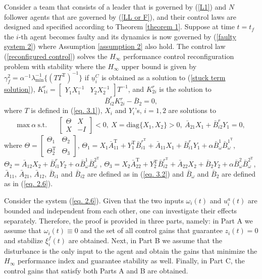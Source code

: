 \documentclass[12pt,draftcls,onecolumn]{IEEEtran}
\begin{document}
\begin{theorems}\label{theorem 2}
Consider a team that consists of  a leader that is governed by (\ref{L1}) and $N$ follower agents that are governed by (\ref{LL or F}), and their control laws are designed and specified according to Theorem \ref{theorem 1}. Suppose at time $t=t_f$ the $i$-th agent becomes faulty and its dynamics is now governed by (\ref{faulty system 2}) where Assumption \ref{assumption 2} also hold. The control law (\ref{reconfigured control}) solves the $H_{\infty}$ performance  control reconfiguration problem with stability  where the  $H_{\infty}$ upper bound is given by  $\gamma_f^2=\alpha^{-1}\lambda_{\text{min}}^{-1}\{(TT^{\text{T}})^{-1}\}$ if $\underline u_i^C$ is obtained as a solution to (\ref{stuck term solution}),  $K_{1i}^{r}=\begin{bmatrix}
Y_1X_1^{-1}&Y_2X_2^{-1}
\end{bmatrix}T^{-1}$, and $K_{2i}^{r}$ is the solution to 
\begin{equation}
  \bar B_{i2}^rK_{2i}^{r}-\bar B_{2}=0,\label{matching equation}
\end{equation}
 where $T$ is  defined in  (\ref{eq. 3.1}),  $X_i$ and $Y_i$'s, $i=1,2$ are solutions to 
\begin{eqnarray}
\text{max} \ \alpha \ \text{s.t.}&&  \begin{bmatrix}
\Theta&X\\
X&-I
\end{bmatrix}
<0, \ X=\text{diag}\{X_1,X_2\}>0,\ \bar A_{21}X_1+\bar B_{i2}^r Y_1= 0, \label{OPP}
\end{eqnarray}
where 
$
\Theta=\begin{bmatrix}\Theta_1&\Theta_2\\\Theta_2^{\text{T}}&\Theta_3\end{bmatrix}$, $
\Theta_1=X_1\bar A_{11}^{\text{T}}+Y_1^{\text{T}}\bar B_{i1}^{r^\text{T}}+\bar A_{11}X_1+\bar B_{i1}^r Y_1+\alpha \bar B^1_{\omega}\bar B_{\omega}^{1^{\text{T}}}$, $\Theta_2=\bar A_{12}X_2+\bar B_{i1}^rY_2+\alpha \bar B^1_{\omega}\bar B_{\omega}^{2^{\text{T}}}$, $\Theta_3=X_2\bar A_{22}^{\text{T}}+Y_2^{\text{T}}\bar B_{i2}^{r^{\text{T}}}+\bar A_{22}X_2+\bar B_{2}Y_2+\alpha\bar B^{2}_{\omega}\bar B_{\omega}^{2^\text{T}}$, $\bar A_{11}$, $\bar A_{21}$, $\bar A_{12}$, $\bar B_{i1}$ and $\bar B_{i2}$ are defined as in (\ref{eq. 3.2}) and $\bar B_{\omega}$ and $\bar B_2$ are  defined as in (\ref{eq. 2.6}).
 \end{theorems}
 \proof 
Consider the system (\ref{eq. 2.6}). Given that the two inputs $\omega_i(t)$ and $u_i^a(t)$  are bounded and independent from each other, one can investigate their effects separately. Therefore, the proof is provided in three parts, namely: in Part A we assume that $\omega_i(t)\equiv0$ and the set of all control gains that guarantee $z_i(t)=0$ and stabilize $\xi_i^f(t)$ are obtained. Next, in Part B we assume that the disturbance is the only input to the agent and obtain the gains that minimize the $H_{\infty}$ performance index and guarantee stability as well.  Finally, in Part C, the control gains that satisfy both Parts A and B are obtained.\par
\end{document}
